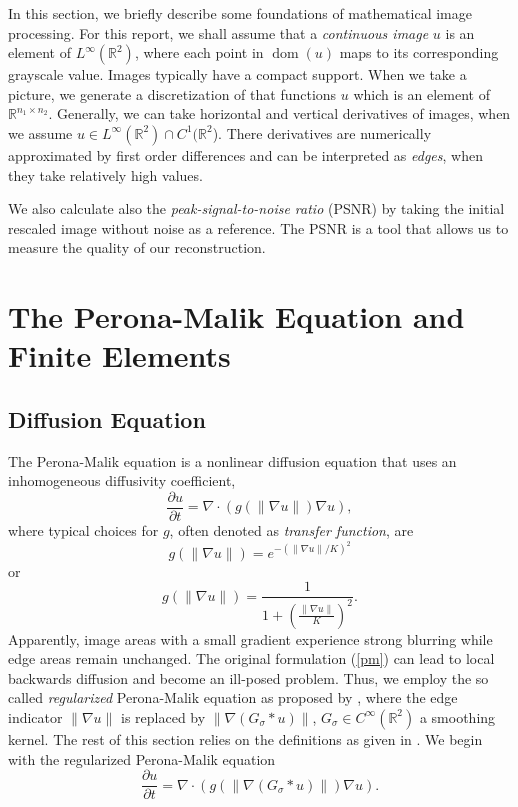 \documentclass{report}
\DeclareMathOperator{\dom}{dom}
\def\R{\mathbb{R}}
\begin{document}
In this section, we briefly describe some foundations of mathematical image processing. For this report, we shall assume that a \emph{continuous image} $u$ is an element of $L^\infty(\R^2)$, where each point in $\dom(u)$ maps to its corresponding grayscale value. Images typically have a compact support. When we take a picture, we generate a discretization of that functions $u$ which is an element of $\R^{n_1 \times n_2}$. Generally, we can take horizontal and vertical derivatives of images, when we assume $u \in L^\infty(\R^2) \cap C^1(\R^2$). There derivatives are numerically approximated by first order differences and can be interpreted as \emph{edges}, when they take relatively high values.

We also calculate also the \emph{peak-signal-to-noise ratio} (PSNR) by taking the initial rescaled image without noise as a reference. The PSNR is a tool that allows us to measure the quality of our reconstruction.

\section{The Perona-Malik Equation and Finite Elements}

\subsection{Diffusion Equation} \label{sec:diffeqn}

The Perona-Malik equation \citep{perona1990} is a nonlinear diffusion equation that uses an inhomogeneous diffusivity coefficient,
\begin{equation} \label{pm}
	\frac{\partial u}{\partial t} = \nabla \cdot \left( g(\|\nabla u\|) \nabla u \right),
\end{equation}
where typical choices for $g$, often denoted as \emph{transfer function}, are
\begin{equation}
	g(\|\nabla u\|) = e^{-(\|\nabla u\|/K)^2}
\end{equation}
or
\begin{equation}
	g(\|\nabla u\|) = \frac{1}{1 + \left( \frac{\|\nabla u\|}{K}\right)^2}.
\end{equation}
Apparently, image areas with a small gradient experience strong blurring while edge areas remain unchanged. The original formulation (\ref{pm}) can lead to local backwards diffusion and become an ill-posed problem. Thus, we employ the so called \emph{regularized} Perona-Malik equation as proposed by \cite{catte1992}, where the edge indicator $\|\nabla u\|$ is replaced by $\|\nabla (G_\sigma \ast u)\|$, $G_\sigma \in C^\infty(\R^2)$ a smoothing kernel. The rest of this section relies on the definitions as given in \cite{handlovicova2002}. We begin with the regularized Perona-Malik equation
\begin{equation} \label{pmreg}
    \frac{\partial u}{\partial t} = \nabla \cdot \left( g\left(\left\|\nabla (G_{\sigma} \ast u)\right\|\right) \nabla u \right).
\end{equation}
\end{document}

